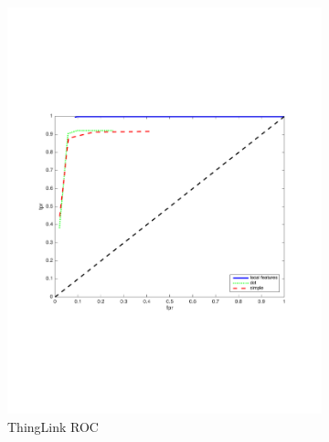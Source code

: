\documentclass[english,12pt,a4paper,pdftex,elec,utf8, table]{aaltothesis}
\begin{document}
\begin{figure}[htb]
\begin{center}
\begin{subfigure}[b]{0.49\textwidth}
    \includegraphics[width=\textwidth]{figures/thinglink_SaturatecolorsROC.pdf}
    \caption{ThingLink ROC}
    \label{Saturatepr}
  \end{subfigure}
  \begin{subfigure}[b]{0.49\textwidth}

\end{subfigure}
\end{center}
\end{figure}
\end{document}
